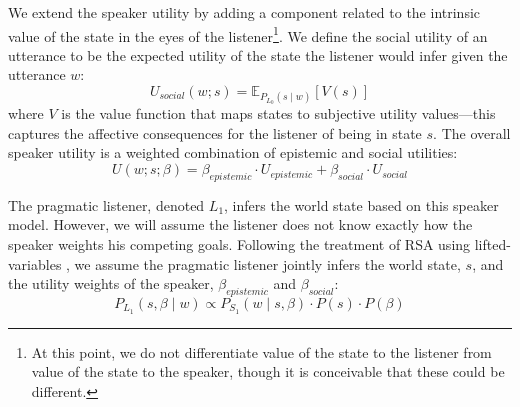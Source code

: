 \documentclass[10pt,letterpaper]{article}
\newcommand{\denote}[1]{\mbox{ $[\![ #1 ]\!]$}}
\newcommand{\ndg}[1]{\textcolor{Green}{[ndg: #1]}}
\begin{document}
We extend the speaker utility by adding a component related to the intrinsic value of the state in the eyes of the listener\footnote{At this point, we do not differentiate value of the state to the listener from value of the state to the speaker, though it is conceivable that these could be different.}.
%
We define the social utility of an utterance to be the expected utility of the state the listener would infer given the utterance $w$: 
%
$$
U_{social}(w; s) = \mathbb{E}_{P_{L_0}(s \mid w)}[V(s)]
$$
%
where $V$ is the value function that maps states to subjective utility values---this captures the affective consequences for the listener of being in state $s$. 
The overall speaker utility is a weighted combination of epistemic and social utilities:
$$
U(w;s; \beta) = \beta_{epistemic}\cdot U_{epistemic} + \beta_{social} \cdot U_{social}
$$
%
%

The pragmatic listener, denoted $L_1$, infers the world state based on this speaker model. 
However, we will assume the listener does not know exactly how the speaker weights his competing goals.
Following the treatment of RSA using lifted-variables \cite{GoodmanLassiter2015, BergenEtAl2016, Kao2014, Degen2015},
we assume the pragmatic listener jointly infers the world state, $s$, and the utility weights of the speaker, $\beta_{epistemic}$ and $\beta_{social}$:
\begin{equation}
P_{L_1}(s, \beta \mid w)\propto P_{S_1}(w \mid s, \beta)\cdot P(s) \cdot P(\beta) \label{eq:L1}
\end{equation}
\end{document}
